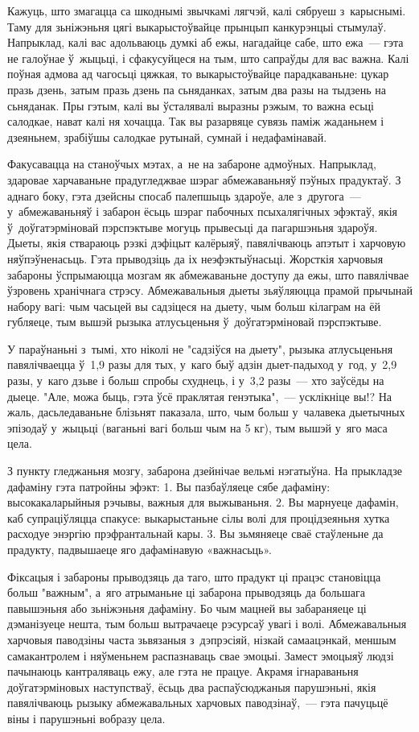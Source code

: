 Кажуць, што змагацца са шкоднымі звычкамі лягчэй, калі сябруеш з~карыснымі. Таму для зьніжэньня цягі выкарыстоўвайце прынцып канкурэнцыі стымулаў. Напрыклад, калі вас адольваюць думкі аб ежы, нагадайце сабе, што ежа~--- гэта не галоўнае ў~жыцьці, і сфакусуйцеся на тым, што сапраўды для вас важна. Калі поўная адмова ад чагосьці цяжкая, то выкарыстоўвайце парадкаваньне: цукар празь дзень, затым празь дзень па сьняданках, затым два разы на тыдзень на сьняданак. Пры гэтым, калі вы ўсталявалі выразны рэжым, то важна есьці салодкае, нават калі ня хочацца. Так вы разарвяце сувязь паміж жаданьнем і дзеяньнем, зрабіўшы салодкае рутынай, сумнай і недафамінавай.

Факусавацца на станоўчых мэтах, а~не на забароне адмоўных. Напрыклад, здаровае харчаваньне прадугледжвае шэраг абмежаваньняў пэўных прадуктаў. З аднаго боку, гэта дзейсны спосаб палепшыць здароўе, але з~другога~--- у~абмежаваньняў і забарон ёсьць шэраг пабочных псыхалягічных эфэктаў, якія ў~доўгатэрміновай пэрспэктыве могуць прывесьці да пагаршэньня здароўя. Дыеты, якія ствараюць рэзкі дэфіцыт калёрыяў, павялічваюць апэтыт і харчовую няўпэўненасьць. Гэта прыводзіць да іх неэфэктыўнасьці. Жорсткія харчовыя забароны ўспрымаюцца мозгам як абмежаваньне доступу да ежы, што павялічвае ўзровень хранічнага стрэсу. Абмежавальныя дыеты зьяўляюцца прамой прычынай набору вагі: чым часьцей вы садзіцеся на дыету, чым больш кілаграм на ёй губляеце, тым вышэй рызыка атлусьценьня ў~доўгатэрміновай пэрспэктыве.

У параўнаньні з~тымі, хто ніколі не "садзіўся на дыету", рызыка атлусьценьня павялічваецца ў~1,9 разы для тых, у~каго быў адзін дыет-падыход у~год, у~2,9 разы, у~каго дзьве і больш спробы схуднець, і у~3,2 разы~--- хто заўсёды на дыеце. "Але, можа быць, гэта ўсё праклятая генэтыка",~--- усклікніце вы!? На жаль, дасьледаваньне блізьнят паказала, што, чым больш у~чалавека дыетычных эпізодаў у~жыцьці (ваганьні вагі больш чым на 5 кг), тым вышэй у~яго маса цела.

З пункту гледжаньня мозгу, забарона дзейнічае вельмі нэгатыўна. На прыкладзе дафаміну гэта патройны эфэкт: 1. Вы пазбаўляеце сябе дафаміну: высокакаларыйныя рэчывы, важныя для выжываньня. 2. Вы марнуеце дафамін, каб супраціўляцца спакусе: выкарыстаньне сілы волі для процідзеяньня хутка расходуе энэргію прэфрантальнай кары. 3. Вы зьмяняеце сваё стаўленьне да прадукту, падвышаеце яго дафамінавую «важнасьць».

Фіксацыя і забароны прыводзяць да таго, што прадукт ці працэс становіцца больш "важным", а~яго атрыманьне ці забарона прыводзяць да большага павышэньня або зьніжэньня дафаміну. Бо чым мацней вы забараняеце ці дэманізуеце нешта, тым больш вытрачаеце рэсурсаў увагі і волі. Абмежавальныя харчовыя паводзіны часта зьвязаныя з~дэпрэсіяй, нізкай самаацэнкай, меншым самакантролем і няўменьнем распазнаваць свае эмоцыі. Замест эмоцыяў людзі пачынаюць кантраляваць ежу, але гэта не працуе. Акрамя ігнараваньня доўгатэрміновых наступстваў, ёсьць два распаўсюджаныя парушэньні, якія павялічваюць рызыку абмежавальных харчовых паводзінаў,~--- гэта пачуцьцё віны і парушэньні вобразу цела.

